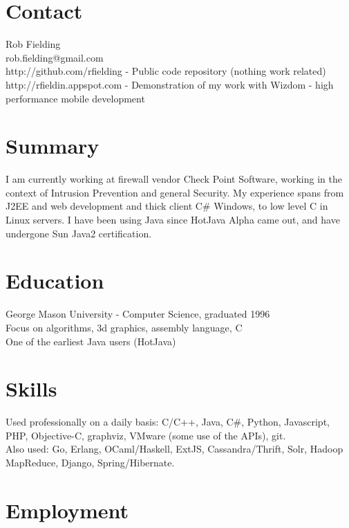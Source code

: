 \documentclass[margin]{res}
\begin{document}
\begin{resume}
\section{Contact}
Rob Fielding \\
rob.fielding@gmail.com \\
http://github.com/rfielding - Public code repository (nothing work related) \\
http://rfieldin.appspot.com - Demonstration of my work with Wizdom - high performance mobile development 

\section{Summary}
I am currently working at firewall vendor Check Point Software,
working in the context of Intrusion Prevention and general Security.
My experience spans from J2EE and web development and thick client
C\# Windows, to low level C in Linux servers.
I have been using Java since HotJava Alpha came out, and have undergone
Sun Java2 certification.

\section{Education}
George Mason University - Computer Science, graduated 1996 \\
Focus on algorithms, 3d graphics, assembly language, C \\
One of the earliest Java users (HotJava) 

\section{Skills}
Used professionally on a daily basis: C/C++, Java, C\#, Python, Javascript, PHP, Objective-C, graphviz, VMware (some use of the APIs), git. \\
Also used: Go, Erlang, OCaml/Haskell, ExtJS, Cassandra/Thrift, Solr, Hadoop MapReduce, Django, Spring/Hibernate. 

\section{Employment}

\end{resume}
\end{document}

